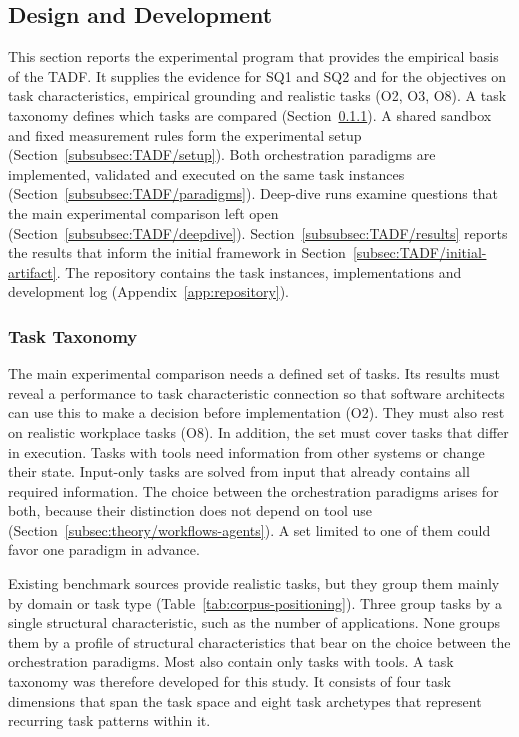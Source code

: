 \subsection{Design and Development}
\label{subsec:TADF/design}
This section reports the experimental program that provides the empirical basis of the TADF. It supplies the evidence for SQ1 and SQ2 and for the objectives on task characteristics, empirical grounding and realistic tasks (O2, O3, O8). A task taxonomy defines which tasks are compared (Section~\ref{subsubsec:TADF/taxonomy}). A shared sandbox and fixed measurement rules form the experimental setup (Section~\ref{subsubsec:TADF/setup}). Both orchestration paradigms are implemented, validated and executed on the same task instances (Section~\ref{subsubsec:TADF/paradigms}). Deep-dive runs examine questions that the main experimental comparison left open (Section~\ref{subsubsec:TADF/deepdive}). Section~\ref{subsubsec:TADF/results} reports the results that inform the initial framework in Section~\ref{subsec:TADF/initial-artifact}. The repository contains the task instances, implementations and development log (Appendix~\ref{app:repository}).

\subsubsection{Task Taxonomy}
\label{subsubsec:TADF/taxonomy}
The main experimental comparison needs a defined set of tasks. Its results must reveal a performance to task characteristic connection so that software architects can use this to make a decision before implementation (O2). They must also rest on realistic workplace tasks (O8). In addition, the set must cover tasks that differ in execution. Tasks with tools need information from other systems or change their state. Input-only tasks are solved from input that already contains all required information. The choice between the orchestration paradigms arises for both, because their distinction does not depend on tool use (Section~\ref{subsec:theory/workflows-agents}). A set limited to one of them could favor one paradigm in advance.

Existing benchmark sources provide realistic tasks, but they group them mainly by domain or task type (Table~\ref{tab:corpus-positioning}). Three group tasks by a single structural characteristic, such as the number of applications. None groups them by a profile of structural characteristics that bear on the choice between the orchestration paradigms. Most also contain only tasks with tools. A task taxonomy was therefore developed for this study. It consists of four task dimensions that span the task space and eight task archetypes that represent recurring task patterns within it.

